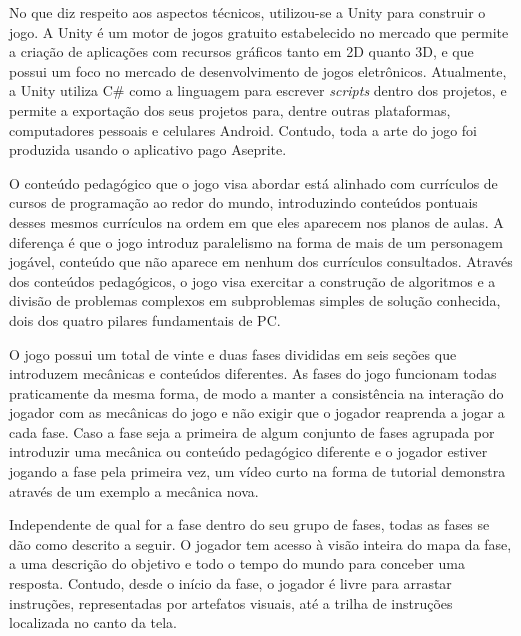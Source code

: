 \documentclass[conference]{IEEEtran}
\begin{document}
No que diz respeito aos aspectos técnicos, utilizou-se a Unity\cite{b20} para construir o jogo. A Unity é um motor de jogos gratuito estabelecido no mercado que permite a criação de aplicações com recursos gráficos tanto em 2D quanto 3D, e que possui um foco no mercado de desenvolvimento de jogos eletrônicos. Atualmente, a Unity utiliza C\#\cite{b21} como a linguagem para escrever \textit{scripts} dentro dos projetos, e permite a exportação dos seus projetos para, dentre outras plataformas, computadores pessoais e celulares Android. Contudo, toda a arte do jogo foi produzida usando o aplicativo pago Aseprite\cite{b22}.

O conteúdo pedagógico que o jogo visa abordar está alinhado com currículos de cursos de programação ao redor do mundo\cite{b8}\cite{b23}, introduzindo conteúdos pontuais desses mesmos currículos na ordem em que eles aparecem nos planos de aulas. A diferença é que o jogo introduz paralelismo na forma de mais de um personagem jogável, conteúdo que não aparece em nenhum dos currículos consultados. Através dos conteúdos pedagógicos, o jogo visa exercitar a construção de algoritmos e a divisão de problemas complexos em subproblemas simples de solução conhecida, dois dos quatro pilares fundamentais de PC\cite{b6}.

O jogo possui um total de vinte e duas fases divididas em seis seções que introduzem mecânicas e conteúdos diferentes. As fases do jogo funcionam todas praticamente da mesma forma, de modo a manter a consistência na interação do jogador com as mecânicas do jogo e não exigir que o jogador reaprenda a jogar a cada fase. Caso a fase seja a primeira de algum conjunto de fases agrupada por introduzir uma mecânica ou conteúdo pedagógico diferente e o jogador estiver jogando a fase pela primeira vez, um vídeo curto na forma de tutorial demonstra através de um exemplo a mecânica nova.

Independente de qual for a fase dentro do seu grupo de fases, todas as fases se dão como descrito a seguir. O jogador tem acesso à visão inteira do mapa da fase, a uma descrição do objetivo e todo o tempo do mundo para conceber uma resposta. Contudo, desde o início da fase, o jogador é livre para arrastar instruções, representadas por artefatos visuais, até a trilha de instruções localizada no canto da tela.
\end{document}
